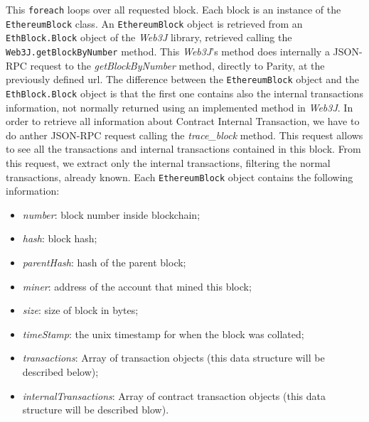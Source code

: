 This \texttt{foreach} loops over all requested block. Each block is an instance of the \texttt{EthereumBlock} class. An \texttt{EthereumBlock} object is retrieved from an \texttt{EthBlock.Block} object of the \textit{Web3J} library, retrieved calling the \texttt{Web3J.getBlockByNumber} method. This \textit{Web3J}'s method does internally a JSON-RPC request to the \textit{getBlockByNumber} method, directly to Parity, at the previously defined url.
\newline
The difference between the \texttt{EthereumBlock} object and the \texttt{EthBlock.Block} object is that the first one contains also the internal transactions information, not normally returned using an implemented method in \textit{Web3J}. \newline
In order to retrieve all information about Contract Internal Transaction, we have to do anther JSON-RPC request calling the \textit{trace\_block} method. This request allows to see all the transactions and internal transactions contained in this block. From this request, we extract only the internal transactions, filtering the normal transactions, already known.
\newline
Each \texttt{EthereumBlock} object contains the following information:
\begin{itemize}
    \item \textit{number}: block number inside blockchain;
    \item \textit{hash}: block hash;
    \item \textit{parentHash}: hash of the parent block;
    \item \textit{miner}: address of the account that mined this block;
    \item \textit{size}: size of block in bytes;
    \item \textit{timeStamp}: the unix timestamp for when the block was collated;
    \item \textit{transactions}: Array of transaction objects (this data structure will be described below);
    \item \textit{internalTransactions}: Array of contract transaction objects (this data structure will be described blow).
\end{itemize}


